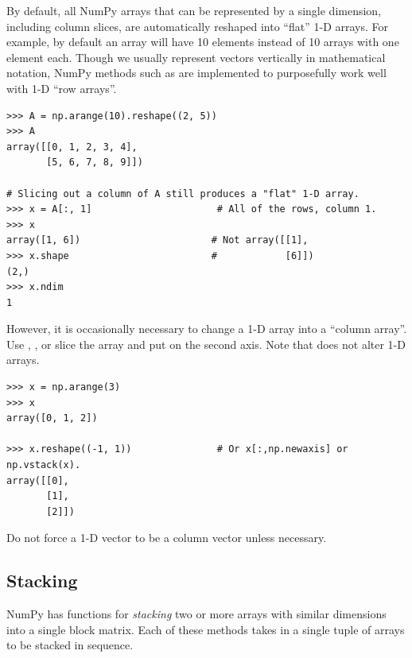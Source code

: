 \begin{info} %
By default, all NumPy arrays that can be represented by a single dimension, including column slices, are automatically reshaped into ``flat'' 1-D arrays.
For example, by default an array will have 10 elements instead of 10 arrays with one element each.
Though we usually represent vectors vertically in mathematical notation, NumPy methods such as  are implemented to purposefully work well with 1-D ``row arrays''.

\begin{lstlisting}
>>> A = np.arange(10).reshape((2, 5))
>>> A
array([[0, 1, 2, 3, 4],
       [5, 6, 7, 8, 9]])

# Slicing out a column of A still produces a "flat" 1-D array.
>>> x = A[:, 1]                      # All of the rows, column 1.
>>> x
array([1, 6])                       # Not array([[1],
>>> x.shape                         #            [6]])
(2,)
>>> x.ndim
1
\end{lstlisting}

However, it is occasionally necessary to change a 1-D array into a ``column array''.
Use , , or slice the array and put  on the second axis.
Note that  does not alter 1-D arrays.

\begin{lstlisting}
>>> x = np.arange(3)
>>> x
array([0, 1, 2])

>>> x.reshape((-1, 1))               # Or x[:,np.newaxis] or np.vstack(x).
array([[0],
       [1],
       [2]])
\end{lstlisting}

Do not force a 1-D vector to be a column vector unless necessary.
\end{info}

\subsection*{Stacking} %

NumPy has functions for \emph{stacking} two or more arrays with similar dimensions into a single block matrix.
Each of these methods takes in a single tuple of arrays to be stacked in sequence.

